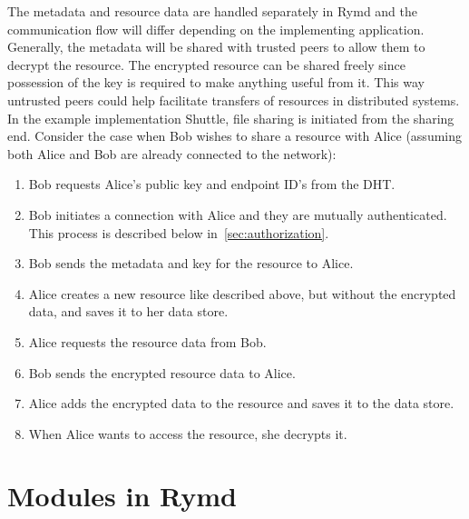 The metadata and resource data are handled separately in Rymd and the communication flow will differ depending on the implementing application. Generally, the metadata will be shared with trusted peers to allow them to decrypt the resource. The encrypted resource can be shared freely since possession of the key is required to make anything useful from it. This way untrusted peers could help facilitate transfers of resources in distributed systems. In the example implementation Shuttle, file sharing is initiated from the sharing end. Consider the case when Bob wishes to share a resource with Alice (assuming both Alice and Bob are already connected to the network):
\begin{enumerate}
  \item Bob requests Alice's public key and endpoint ID's from the DHT.
  \item Bob initiates a connection with Alice and they are mutually authenticated. This process is described below in~\ref{sec:authorization}.
  \item Bob sends the metadata and key for the resource to Alice.
  \item Alice creates a new resource like described above, but without the encrypted data, and saves it to her data store.
  \item Alice requests the resource data from Bob.
  \item Bob sends the encrypted resource data to Alice.
  \item Alice adds the encrypted data to the resource and saves it to the data store.
  \item When Alice wants to access the resource, she decrypts it.
\end{enumerate}

\section{Modules in Rymd}

